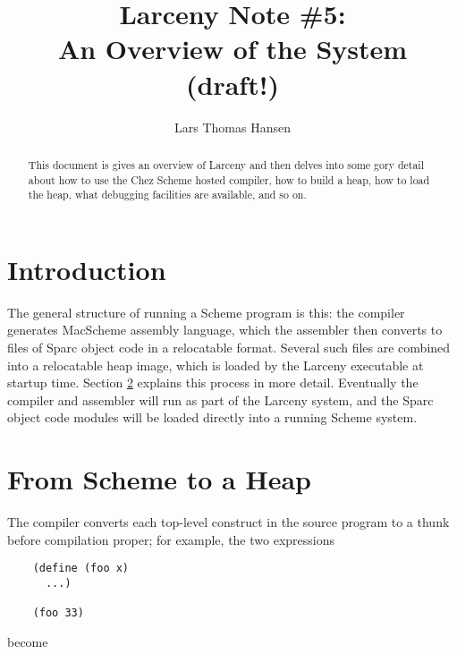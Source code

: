 

\title{Larceny Note \#5: \\
       An Overview of the System \\
       {\tenrm (draft!)}}
\author{Lars Thomas Hansen}


\maketitle

\begin{abstract}
This document is gives an overview of Larceny and then delves
into some gory detail about how to use the Chez Scheme hosted compiler,
how to build a heap, how to load the heap, what debugging facilities are
available, and so on.
\end{abstract}

\section{Introduction}

The general structure of running a Scheme program is this: the
compiler generates MacScheme assembly language, which the assembler
then converts to files of Sparc object code in a relocatable format.
Several such files are combined into a relocatable heap image, which
is loaded by the Larceny executable at startup time. Section
\ref{compiling} explains this process in more detail. Eventually the
compiler and assembler will run as part of the Larceny system, and the
Sparc object code modules will be loaded directly into a running
Scheme system.


\section{From Scheme to a Heap}
\label{compiling}

The compiler converts each top-level construct in the source program
to a thunk before compilation proper; for example, the two expressions

\begin{minipage}{\linewidth}
\begin{verbatim}
    (define (foo x)
      ...)

    (foo 33)
\end{verbatim}
\end{minipage}

\noindent become

